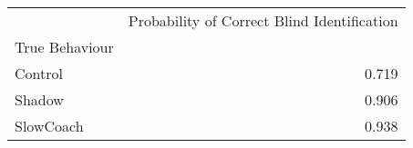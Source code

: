 \begin{tabular}{lr}
\toprule
{} &  Probability of Correct Blind Identification \\
True Behaviour &                                              \\
\midrule
Control        &                                        0.719 \\
Shadow         &                                        0.906 \\
SlowCoach      &                                        0.938 \\
\bottomrule
\end{tabular}
